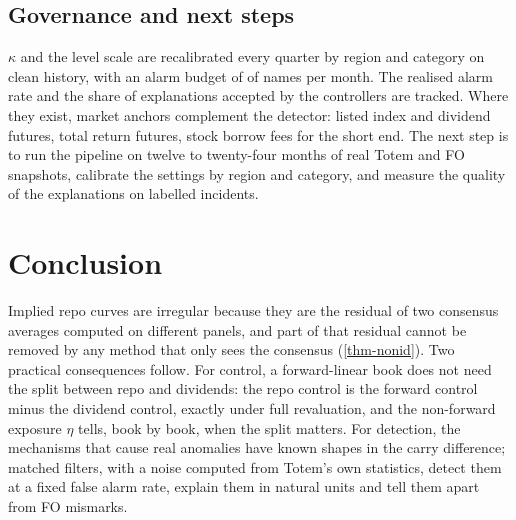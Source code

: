 \subsection{Governance and next steps}
$\kappa$ and the level scale are recalibrated every quarter by region and category on clean history, with an alarm
budget of \vFPR{} of names per month. The realised alarm rate and the share of explanations accepted by the
controllers are tracked. Where they exist, market anchors complement the detector: listed index and dividend futures,
total return futures, stock borrow fees for the short end. The next step is to run the pipeline on twelve to
twenty-four months of real Totem and FO snapshots, calibrate the settings by region and category, and measure the
quality of the explanations on labelled incidents.

\section*{Conclusion}
Implied repo curves are irregular because they are the residual of two consensus averages computed on different
panels, and part of that residual cannot be removed by any method that only sees the consensus (\cref{thm-nonid}). Two
practical consequences follow. For control, a forward-linear book does not need the split between repo and dividends:
the repo control is the forward control minus the dividend control, exactly under full revaluation, and the
non-forward exposure $\eta$ tells, book by book, when the split matters. For detection, the mechanisms that cause real
anomalies have known shapes in the carry difference; matched filters, with a noise computed from Totem's own
statistics, detect them at a fixed false alarm rate, explain them in natural units and tell them apart from FO
mismarks.
